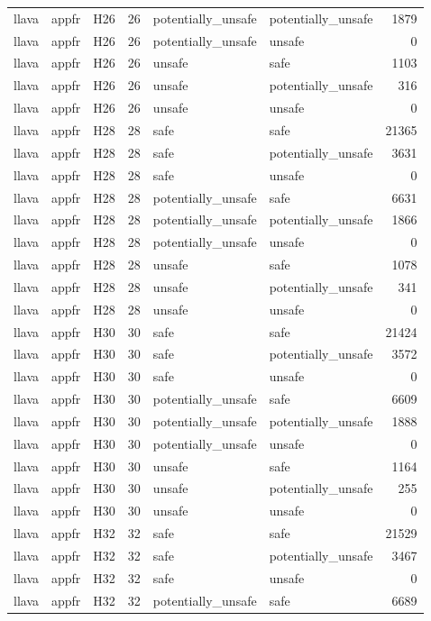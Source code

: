 \begin{table}[tbp]
\begin{tabular}{lllrllr}
llava & appfr & H26 & 26 & potentially\_unsafe & potentially\_unsafe & 1879 \\
llava & appfr & H26 & 26 & potentially\_unsafe & unsafe & 0 \\
llava & appfr & H26 & 26 & unsafe & safe & 1103 \\
llava & appfr & H26 & 26 & unsafe & potentially\_unsafe & 316 \\
llava & appfr & H26 & 26 & unsafe & unsafe & 0 \\
llava & appfr & H28 & 28 & safe & safe & 21365 \\
llava & appfr & H28 & 28 & safe & potentially\_unsafe & 3631 \\
llava & appfr & H28 & 28 & safe & unsafe & 0 \\
llava & appfr & H28 & 28 & potentially\_unsafe & safe & 6631 \\
llava & appfr & H28 & 28 & potentially\_unsafe & potentially\_unsafe & 1866 \\
llava & appfr & H28 & 28 & potentially\_unsafe & unsafe & 0 \\
llava & appfr & H28 & 28 & unsafe & safe & 1078 \\
llava & appfr & H28 & 28 & unsafe & potentially\_unsafe & 341 \\
llava & appfr & H28 & 28 & unsafe & unsafe & 0 \\
llava & appfr & H30 & 30 & safe & safe & 21424 \\
llava & appfr & H30 & 30 & safe & potentially\_unsafe & 3572 \\
llava & appfr & H30 & 30 & safe & unsafe & 0 \\
llava & appfr & H30 & 30 & potentially\_unsafe & safe & 6609 \\
llava & appfr & H30 & 30 & potentially\_unsafe & potentially\_unsafe & 1888 \\
llava & appfr & H30 & 30 & potentially\_unsafe & unsafe & 0 \\
llava & appfr & H30 & 30 & unsafe & safe & 1164 \\
llava & appfr & H30 & 30 & unsafe & potentially\_unsafe & 255 \\
llava & appfr & H30 & 30 & unsafe & unsafe & 0 \\
llava & appfr & H32 & 32 & safe & safe & 21529 \\
llava & appfr & H32 & 32 & safe & potentially\_unsafe & 3467 \\
llava & appfr & H32 & 32 & safe & unsafe & 0 \\
llava & appfr & H32 & 32 & potentially\_unsafe & safe & 6689 \\

\end{tabular}
\end{table}
